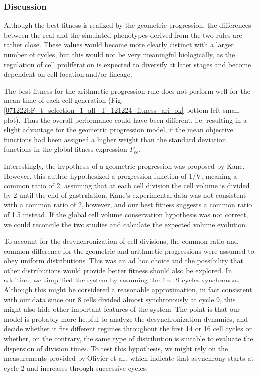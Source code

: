 \subsubsection{Discussion}


Although the best fitness is realized by the geometric progression, the differences between the real and the simulated phenotypes derived from the two rules are rather close. These values would become more clearly distinct with a larger number of cycles, but this would not be very meaningful biologically, as the regulation of cell proliferation is expected to diversify at later stages and become dependent on cell location and/or lineage.

The best fitness for the arithmetic progression rule does not perform well for the mean time of each cell generation (Fig. \ref{071222bF_t_selection_1_all_T_121224_fitness_ari_ok} bottom left small plot). Thus the overall performance could have been different, i.e. resulting in a slight advantage for the geometric progression model, if the mean objective functions had been assigned a higher weight than the standard deviation functions in the global fitness expression $F_{\mathrm{cc}}$.

Interestingly, the hypothesis of a geometric progression was proposed by Kane. However, this author hypothesized a progression function of 1/V, meaning a common ratio of 2, assuming that at each cell division the cell volume is divided by 2 until the end of gastrulation. Kane's experimental data was not consistent with a common ratio of 2, however, and our best fitness suggests a common ratio of 1.5 instead. If the global cell volume conservation hypothesis was not correct, we could reconcile the two studies and calculate the expected volume evolution.

To account for the desynchronization of cell divisions, the common ratio and common difference for the geometric and arithmetic progressions were assumed to obey uniform distributions. This was an ad hoc choice and the possibility that other distributions would provide better fitness should also be explored. In addition, we simplified the system by assuming the first 9 cycles synchronous. Although this might be considered a reasonable approximation, in fact consistent with our data since our 8 cells divided almost synchronously at cycle 9, this might also hide other important features of the system. The point is that our model is probably more helpful to analyze the desynchronization dynamics, and decide whether it fits different regimes throughout the first 14 or 16 cell cycles or whether, on the contrary, the same type of distribution is suitable to evaluate the dispersion of division times. To test this hypothesis, we might rely on the measurements provided by Olivier et al., which indicate that asynchrony starts at cycle 2 and increases through successive cycles.

